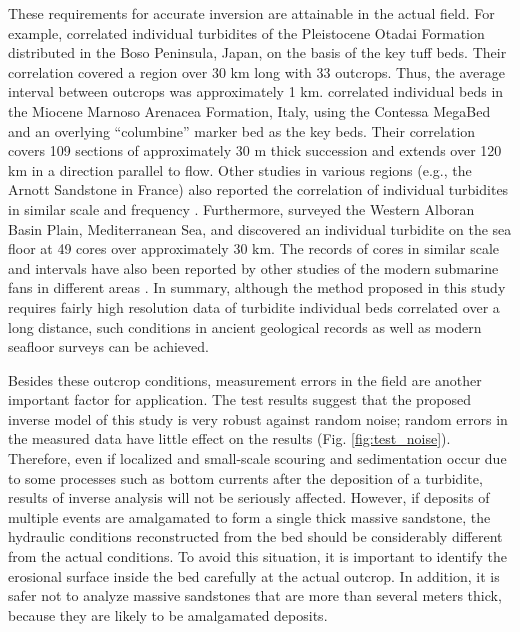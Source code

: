 These requirements for accurate inversion are attainable in the actual field. For example, \citet{Hirayama1977} correlated individual turbidites of the Pleistocene Otadai Formation distributed in the Boso Peninsula, Japan, on the basis of the key tuff beds. Their correlation covered a region over 30 km long with 33 outcrops. Thus, the average interval between outcrops was approximately 1 km. \citet{Amy2006} correlated individual beds in the Miocene Marnoso Arenacea Formation, Italy, using the Contessa MegaBed and an overlying ``columbine'' marker bed as the key beds. Their correlation covers 109 sections of approximately 30 m thick succession and extends over 120 km in a direction parallel to flow. Other studies in various regions (e.g., the Arnott Sandstone in France) also reported the correlation of individual turbidites in similar scale and frequency \citep{HESSE1974,Tokuhashi1979,Tokuhashi1989,Amy2000,Amy2004}. Furthermore, \citet{Bartolini1972} surveyed the Western Alboran Basin Plain, Mediterranean Sea, and discovered an individual turbidite on the sea floor at 49 cores over approximately 30 km. The records of cores in similar scale and intervals have also been reported by other studies of the modern submarine fans in different areas \citep{BORNHOLD1971, Pilkey1980}. In summary, although the method proposed in this study requires fairly high resolution data of turbidite individual beds correlated over a long distance, such conditions in ancient geological records as well as modern seafloor surveys can be achieved.

Besides these outcrop conditions, measurement errors in the field are another important factor for application. The test results suggest that the proposed inverse model of this study is very robust against random noise; random errors in the measured data have little effect on the results (Fig. \ref{fig:test_noise}). Therefore, even if localized and small-scale scouring and sedimentation occur due to some processes such as bottom currents after the deposition of a turbidite, results of inverse analysis will not be seriously affected. However, if deposits of multiple events are amalgamated to form a single thick massive sandstone, the hydraulic conditions reconstructed from the bed should be considerably different from the actual conditions. To avoid this situation, it is important to identify the erosional surface inside the bed carefully at the actual outcrop. In addition, it is safer not to analyze massive sandstones that are more than several meters thick, because they are likely to be amalgamated deposits.


